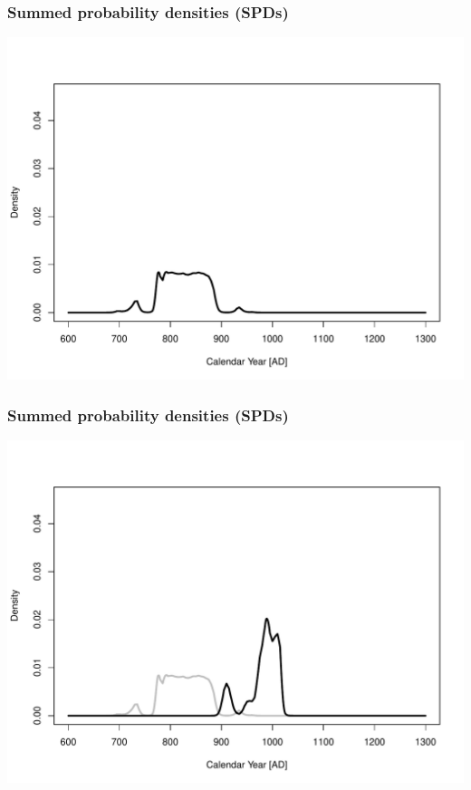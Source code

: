 \documentclass{beamer}
\begin{document}
\begin{frame}[t]
  \frametitle{Summed probability densities (SPDs)}
    \includegraphics[height=.85\textheight]{spd1.pdf}
\end{frame}

\begin{frame}[t]
  \frametitle{Summed probability densities (SPDs)}
    \includegraphics[height=.85\textheight]{spd2.pdf}
\end{frame}
\end{document}
